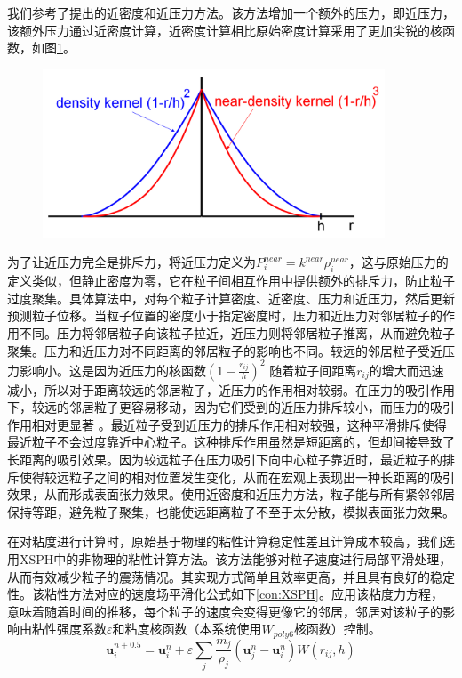 我们参考了\cite{clavet2005particle}提出的近密度和近压力方法。该方法增加一个额外的压力，即近压力，该额外压力通过近密度计算，近密度计算相比原始密度计算采用了更加尖锐的核函数，如图\ref{fig:nearkernel}。
\begin{figure}[ht]
 \centering
 \includegraphics[height=5cm]{image/nearkernel.png}
 \label{fig:nearkernel}
\end{figure}
为了让近压力完全是排斥力，将近压力定义为$P_i^{near}=k^{near}\rho_i^{near}$，这与原始压力的定义类似，但静止密度为零，它在粒子间相互作用中提供额外的排斥力，防止粒子过度聚集。具体算法中，对每个粒子计算密度、近密度、压力和近压力，然后更新预测粒子位移。当粒子位置的密度小于指定密度时，压力和近压力对邻居粒子的作用不同。压力将邻居粒子向该粒子拉近，近压力则将邻居粒子推离，从而避免粒子聚集。压力和近压力对不同距离的邻居粒子的影响也不同。较远的邻居粒子受近压力影响小。这是因为近压力的核函数$(1-\frac{r_{ij}}{h})^2$ 随着粒子间距离$r_{ij}$的增大而迅速减小，所以对于距离较远的邻居粒子，近压力的作用相对较弱。在压力的吸引作用下，较远的邻居粒子更容易移动，因为它们受到的近压力排斥较小，而压力的吸引作用相对更显著 。最近粒子受到近压力的排斥作用相对较强，这种平滑排斥使得最近粒子不会过度靠近中心粒子。这种排斥作用虽然是短距离的，但却间接导致了长距离的吸引效果。因为较远粒子在压力吸引下向中心粒子靠近时，最近粒子的排斥使得较远粒子之间的相对位置发生变化，从而在宏观上表现出一种长距离的吸引效果，从而形成表面张力效果。使用近密度和近压力方法，粒子能与所有紧邻邻居保持等距，避免粒子聚集，也能使远距离粒子不至于太分散，模拟表面张力效果。

在对粘度进行计算时，原始基于物理的粘性计算稳定性差且计算成本较高，我们选用XSPH\cite{schechter2012ghost}中的非物理的粘性计算方法。该方法能够对粒子速度进行局部平滑处理，从而有效减少粒子的震荡情况。其实现方式简单且效率更高，并且具有良好的稳定性。该粘性方法对应的速度场平滑化公式如下\eqref{con:XSPH}。应用该粘度力方程，意味着随着时间的推移，每个粒子的速度会变得更像它的邻居，邻居对该粒子的影响由粘性强度系数$\varepsilon$和粘度核函数（本系统使用$W_{poly6}$核函数）控制。
\begin{equation}
    \mathbf{u} _i^{n+0.5}=\mathbf{u} _i^n+\varepsilon \sum_j \frac{m_j}{\rho_j}(\mathbf{u}_j^n-\mathbf{u}_i^n)W(r_{ij},h)
    \label{con:XSPH}
\end{equation}

